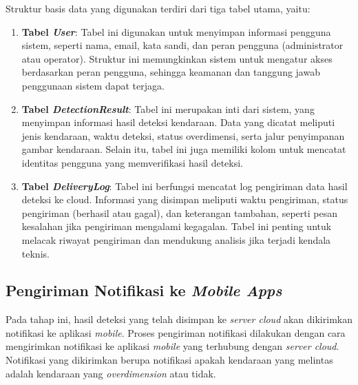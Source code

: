 Struktur basis data yang digunakan terdiri dari tiga tabel utama, yaitu:

\begin{enumerate}[nolistsep,label=\textbf{\arabic*.}]

  \item \textbf{Tabel \emph{User}}: Tabel ini digunakan untuk menyimpan informasi pengguna sistem, seperti nama, email, kata sandi, dan peran pengguna (administrator atau operator). Struktur ini memungkinkan sistem untuk mengatur akses berdasarkan peran pengguna, sehingga keamanan dan tanggung jawab penggunaan sistem dapat terjaga.
  \item \textbf{Tabel \emph{DetectionResult}}: Tabel ini merupakan inti dari sistem, yang menyimpan informasi hasil deteksi kendaraan. Data yang dicatat meliputi jenis kendaraan, waktu deteksi, status overdimensi, serta jalur penyimpanan gambar kendaraan. Selain itu, tabel ini juga memiliki kolom untuk mencatat identitas pengguna yang memverifikasi hasil deteksi.
  \item \textbf{Tabel \emph{DeliveryLog}}: Tabel ini berfungsi mencatat log pengiriman data hasil deteksi ke cloud. Informasi yang disimpan meliputi waktu pengiriman, status pengiriman (berhasil atau gagal), dan keterangan tambahan, seperti pesan kesalahan jika pengiriman mengalami kegagalan. Tabel ini penting untuk melacak riwayat pengiriman dan mendukung analisis jika terjadi kendala teknis.
\end{enumerate}

\subsection{Pengiriman Notifikasi ke \emph{Mobile Apps}}

Pada tahap ini, hasil deteksi yang telah disimpan ke \emph{server cloud} akan dikirimkan notifikasi ke aplikasi \emph{mobile}. Proses pengiriman notifikasi dilakukan dengan cara mengirimkan notifikasi ke aplikasi \emph{mobile} yang terhubung dengan \emph{server cloud}. Notifikasi yang dikirimkan berupa notifikasi apakah kendaraan yang melintas adalah kendaraan yang \emph{overdimension} atau tidak.